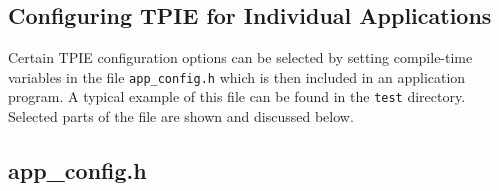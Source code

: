 \subsection{Configuring TPIE for Individual Applications}\label{sec:appconfig}

Certain TPIE configuration options can be selected by
setting compile-time variables in the file
\verb|app_config.h|
which is then included in an application program. A typical
example of this file can be found in the \verb|test|
directory. Selected parts of the file are shown
and discussed below. 

\subsection{app\_config.h}

